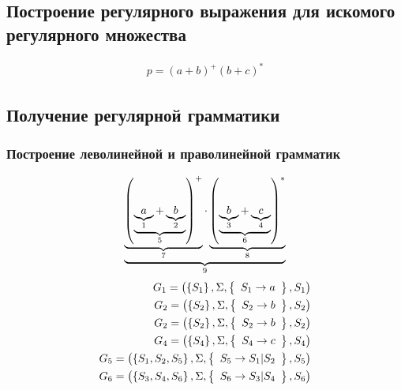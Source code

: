 \subsection{Построение регулярного выражения для искомого регулярного множества}
\begin{align}
	p=(a+b)^+(b+c)^*
\end{align}
\subsection{Получение регулярной грамматики}
\subsubsection{Построение леволинейной и праволинейной грамматик}
\begin{align}
	\ub{ %
		\ub{ %
			\left(\ub{\ub{a}_{1} + \ub{b}_{2}}_{5}\right)^{+}
		}_{7} %
		\cdot
		\ub{
			\left(\ub{\ub{b}_{3} + \ub{c}_{4}}_{6}\right)^{*}
		}_{8} %
	}_{9}%
\end{align}
\begin{align*}
	G_1 = \left( \left\{S_1\right\}, \Sigma, \left\{\begin{array}{c} S_1 \to a \end{array}\right\}, S_1 \right)                      \\
	G_2 = \left( \left\{S_2\right\}, \Sigma, \left\{\begin{array}{c} S_2 \to b \end{array}\right\}, S_2 \right)                      \\
	G_2 = \left( \left\{S_2\right\}, \Sigma, \left\{\begin{array}{c} S_2 \to b \end{array}\right\}, S_2 \right)                      \\
	G_4 = \left( \left\{S_4\right\}, \Sigma, \left\{\begin{array}{c} S_4 \to c \end{array}\right\}, S_4 \right)                      \\
	G_5 = \left( \left\{S_1, S_2, S_5\right\}, \Sigma, \left\{\begin{array}{c} S_5 \to S_1\vert S_2 \end{array}\right\}, S_5 \right) \\
	G_6 = \left( \left\{S_3, S_4, S_6\right\}, \Sigma, \left\{\begin{array}{c} S_6 \to S_3\vert S_4 \end{array}\right\}, S_6 \right) \\
\end{align*}
